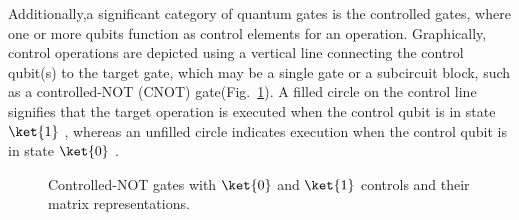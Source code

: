 \documentclass{article}
\begin{document}
    Additionally,a significant category of quantum gates is the controlled gates, where one or more qubits function as control elements for an operation.
    Graphically, control operations are depicted using a vertical line connecting the control qubit(s) to the target gate, which may be a single gate or a subcircuit block, such as a controlled-NOT (CNOT) gate(Fig.~\ref{fig:controlled-gates}).
    A filled circle on the control line signifies that the target operation is executed when the control qubit is in state $\ket{1}$ , whereas an unfilled circle indicates execution when the control qubit is in state $\ket{0}$ .
    \begin{figure}[htbp]
        \centering
        \hspace{1cm}
        \caption{Controlled-NOT gates with $\ket{0}$ and $\ket{1}$ controls and their matrix representations.}\label{fig:controlled-gates}
    \end{figure}
\end{document}
